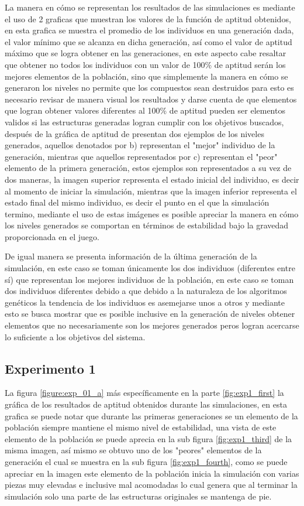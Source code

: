 La manera en cómo se representan los resultados de las simulaciones es mediante
el uso de 2 graficas que muestran los valores de la función de aptitud
obtenidos, en esta grafica se muestra el promedio de los individuos en una
generación dada, el valor mínimo que se alcanza en dicha generación, así como el
valor de aptitud máximo que se logra obtener en las generaciones, en este
aspecto cabe resaltar que obtener no todos los individuos con un valor de 100\%
de aptitud serán los mejores elementos de la población, sino que simplemente la
manera en cómo se generaron los niveles no permite que los compuestos sean
destruidos para esto es necesario revisar de manera visual los resultados y
darse cuenta de que elementos que logran obtener valores diferentes al 100\% de
aptitud pueden ser elementos validos si las estructuras generadas logran cumplir
con los objetivos buscados, después de la gráfica de aptitud de presentan dos
ejemplos de los niveles generados, aquellos denotados por b) representan el
"mejor" individuo de la generación, mientras que aquellos representados por c)
representan el "peor" elemento de la primera generación, estos ejemplos son
representados a su vez de dos maneras, la imagen superior representa el estado
inicial del individuo, es decir al momento de iniciar la simulación, mientras
que la imagen inferior representa el estado final del mismo individuo, es decir
el punto en el que la simulación termino, mediante el uso de estas imágenes es
posible apreciar la manera en cómo los niveles generados se comportan en
términos de estabilidad bajo la gravedad proporcionada en el juego.

De igual manera se presenta información de la última generación de la
simulación, en este caso se toman únicamente los dos individuos (diferentes
entre sí) que representan los mejores individuos de la población, en este caso
se toman dos individuos diferentes debido a que debido a la naturaleza de los
algoritmos genéticos la tendencia de los individuos es asemejarse unos a otros y
mediante esto se busca mostrar que es posible inclusive en la generación de
niveles obtener elementos que no necesariamente son los mejores generados peros
logran acercarse lo suficiente a los objetivos del sistema.

\subsection{Experimento 1}
\label{chap6:exp_1}

La figura \ref{figure:exp_01_a} más específicamente en la parte
\ref{fig:exp1_first} la gráfica de los resultados de aptitud obtenidos durante
las simulaciones, en esta grafica se puede notar que durante las primeras
generaciones se un elemento de la población siempre mantiene el mismo nivel de
estabilidad, una vista de este elemento de la población se puede aprecia en la
sub figura \ref{fig:exp1_third} de la misma imagen, así mismo se obtuvo uno de
los "peores" elementos de la generación el cual se muestra en la sub figura
\ref{fig:exp1_fourth}, como se puede apreciar en la imagen este elemento de la
población inicia la simulación con varias piezas muy elevadas e inclusive mal
acomodadas lo cual genera que al terminar la simulación solo una parte de las
estructuras originales se mantenga de pie.

